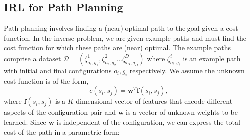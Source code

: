 \documentclass{article}  %
\begin{document}





\subsection{IRL for Path Planning \label{subsec:inverse_problem}}
Path planning involves finding a (near) optimal path to the goal given a cost function. In the inverse problem, we are given example paths and must find the cost function for which these paths are (near) optimal.  The example paths comprise a dataset $\mathcal{D} = (\zeta^1_{o_1,g_1},\zeta^2_{o_2,g_2}...\zeta^D_{o_D,g_D})$ where $\zeta^i_{o_i,g_i}$ is an example path with initial and final configurations $o_i,g_i$ respectively. We assume the unknown cost function is of the form,
\begin{equation}
	c(s_i,s_j) = \mathbf{w}^T \mathbf{f}(s_i,s_j), \label{eq:inner_prod}
\end{equation}
where $\mathbf{f}(s_i,s_j)$ is a $K$-dimensional vector of features that encode different aspects of the configuration pair and $\mathbf{w}$ is a vector of unknown weights to be learned. Since $\mathbf{w}$ is independent of the configuration, we can express the total cost of the path in a parametric form:
\end{document}
